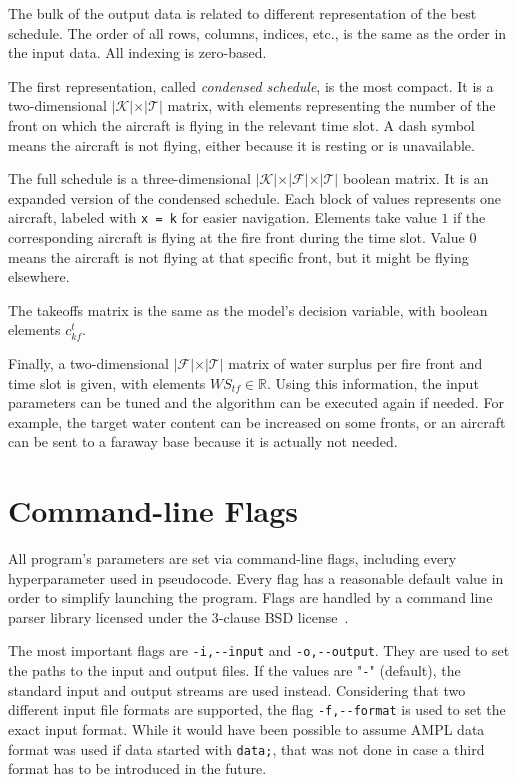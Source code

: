 The bulk of the output data is related to different representation of the best schedule.
The order of all rows, columns, indices, etc., is the same as the order in the input data.
All indexing is zero-based.

The first representation, called \textit{condensed schedule}, is the most compact.
It is a two-dimensional $\vert \mathcal{K} \vert \times \vert \mathcal{T} \vert$ matrix, with elements representing the number of the front on which the aircraft is flying in the relevant time slot.
A dash symbol means the aircraft is not flying, either because it is resting or is unavailable.

The full schedule is a three-dimensional $\vert \mathcal{K} \vert \times \vert \mathcal{F} \vert \times \vert \mathcal{T} \vert$ boolean matrix.
It is an expanded version of the condensed schedule.
Each block of values represents one aircraft, labeled with \texttt{x = k} for easier navigation.
Elements take value $1$ if the corresponding aircraft is flying at the fire front during the time slot.
Value $0$ means the aircraft is not flying at that specific front, but it might be flying elsewhere.

The takeoffs matrix is the same as the model's decision variable, with boolean elements $c_{kf}^t$.

Finally, a two-dimensional $\vert \mathcal{F} \vert \times \vert \mathcal{T} \vert$ matrix of water surplus per fire front and time slot is given, with elements $\mathit{WS}_{tf} \in \mathbb{R}$.
Using this information, the input parameters can be tuned and the algorithm can be executed again if needed.
For example, the target water content can be increased on some fronts, or an aircraft can be sent to a faraway base because it is actually not needed.


\section{Command-line Flags}

All program's parameters are set via command-line flags, including every hyperparameter used in pseudocode.
Every flag has a reasonable default value in order to simplify launching the program.
Flags are handled by a command line parser library licensed under the 3-clause BSD license~\cite{Schreiner/CLI11}.

The most important flags are \texttt{-i,-{}-input} and \texttt{-o,-{}-output}.
They are used to set the paths to the input and output files.
If the values are "\texttt{-}" (default), the standard input and output streams are used instead.
Considering that two different input file formats are supported, the flag \texttt{-f,-{}-format} is used to set the exact input format.
While it would have been possible to assume AMPL data format was used if data started with \texttt{data;}, that was not done in case a third format has to be introduced in the future.

